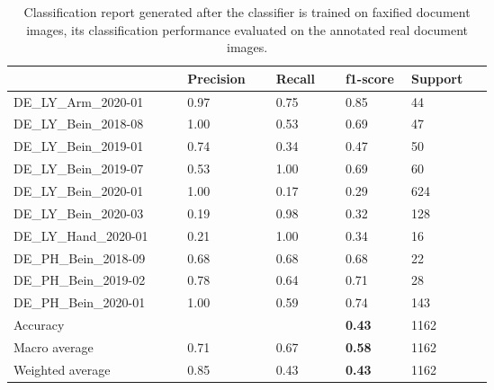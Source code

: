 \begin{center}
\begin{table}[H]
    \begin{center}
    \begin{tabular}{P{0.22\linewidth} P{0.10\linewidth} P{0.10\linewidth} P{0.10\linewidth} P{0.10\linewidth}} 
        \toprule
            & Precision & Recall & f1-score & Support\\[0.0ex] 
        \midrule
        DE\_LY\_Arm\_2020-01 & 0.97 & 0.75 & 0.85 & 44\\[0.0ex]
        \midrule
        DE\_LY\_Bein\_2018-08 & 1.00 & 0.53 & 0.69 & 47\\[0.0ex]
        \midrule
        DE\_LY\_Bein\_2019-01 & 0.74 & 0.34 & 0.47 & 50\\[0.0ex]
        \midrule
        DE\_LY\_Bein\_2019-07 & 0.53 & 1.00 & 0.69 & 60\\[0.0ex]
        \midrule
        DE\_LY\_Bein\_2020-01 & 1.00 & 0.17 & 0.29 & 624\\[0.0ex]
        \midrule
        DE\_LY\_Bein\_2020-03 & 0.19 & 0.98 & 0.32 & 128\\[0.0ex]
        \midrule
        DE\_LY\_Hand\_2020-01 & 0.21 & 1.00 & 0.34 & 16\\[0.0ex]
        \midrule
        DE\_PH\_Bein\_2018-09 & 0.68 & 0.68 & 0.68 & 22\\[0.0ex]
        \midrule
        DE\_PH\_Bein\_2019-02 & 0.78 & 0.64 & 0.71 & 28\\[0.0ex]
        \midrule
        DE\_PH\_Bein\_2020-01 & 1.00 & 0.59 & 0.74 & 143\\[0.0ex]
        \midrule
        \midrule
        Accuracy              &      &      & \bf{0.43} & 1162\\[0.0ex]
        Macro average             & 0.71 & 0.67 & \bf{0.58} & 1162\\[0.0ex]
        Weighted average          & 0.85 & 0.43 & \bf{0.43} & 1162\\[0.0ex]

        \bottomrule
    \end{tabular}
    \caption[Classification report generated after the classifier is trained on faxified document images, its classification performance evaluated on the annotated real document images.]{Classification report generated after the classifier is trained on faxified document images, its classification performance evaluated on the annotated real document images.}
    \label{table:FaxifiedClassificationReport}
    \end{center}
\end{table}
\end{center}



















